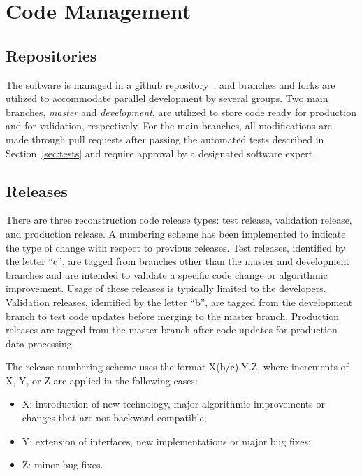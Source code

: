 \section{Code Management}
\label{sec:manage}

\subsection{Repositories}

The software is managed in a github repository~\cite{recon-github}, and branches and forks are utilized to
accommodate parallel development by several groups.  Two main branches, {\it master} and {\it development}, are
utilized to store code ready for production and for validation, respectively. For the main branches, all modifications
are made through pull requests after passing the automated tests described in Section~\ref{sec:tests} and require
approval by a designated software expert.

\subsection{Releases}

There are three reconstruction code release types: test release, validation release, and production release. A
numbering scheme has been implemented to indicate the type of change with respect to previous releases. Test
releases, identified by the letter ``c'', are tagged from branches other than the master and development branches
and are intended to validate a specific code change or algorithmic improvement. Usage of these releases is typically
limited to the developers. Validation releases, identified by the letter ``b'', are tagged from the development branch
to test code updates before merging to the master branch. Production releases are tagged from the master branch
after code updates for production data processing.

The release numbering scheme uses the format X(b/c).Y.Z, where increments of X, Y, or Z are applied in the
following cases:

\begin{itemize}
  \item X: introduction of new technology, major algorithmic improvements or changes that are not backward
  compatible;
  \item Y: extension of interfaces, new implementations or major bug fixes;
  \item Z: minor bug fixes.
\end{itemize}

